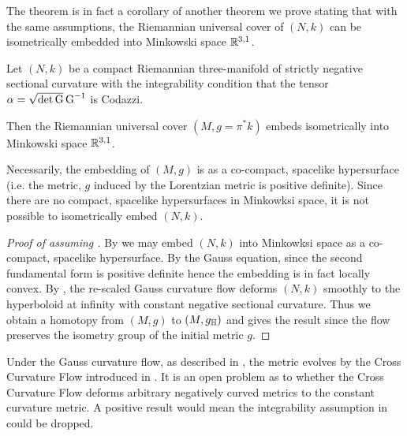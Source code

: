 \documentclass[a4paper, 12pt]{amsart}
\begin{document}
The theorem is in fact a corollary of another theorem we prove stating that with the same assumptions, the Riemannian universal cover of \((N, k)\) can be isometrically embedded into Minkowski space \(\mathbb{R}^{3,1}\).

\begin{thm}
\label{thm:intg_embed}
Let \((N, k)\) be a compact Riemannian three-manifold of strictly negative sectional curvature with the integrability condition that the tensor \(\alpha = \sqrt{\det \operatorname{G}} \operatorname{G}^{-1}\) is Codazzi.

Then the Riemannian universal cover \((M, g = \pi^{\ast} k)\) embeds isometrically into Minkowski space \(\mathbb{R}^{3,1}\).
\end{thm}

\begin{rem}
Necessarily, the embedding of \((M, g)\) is as a co-compact, spacelike hypersurface (i.e. the metric, \(g\) induced by the Lorentzian metric is positive definite). Since there are no compact, spacelike hypersurfaces in Minkowksi space, it is not possible to isometrically embed \((N, k)\).
\end{rem}

\begin{proof}
[Proof of  assuming ]

By  we may embed \((N, k)\) into Minkowksi space as a co-compact, spacelike hypersurface. By the Gauss equation, since the second fundamental form is positive definite hence the embedding is in fact locally convex. By \cite[Theorem 1.1]{MR3344442}, the re-scaled Gauss curvature flow deforms \((N, k)\) smoothly to the hyperboloid at infinity with constant negative sectional curvature. Thus we obtain a homotopy from \((M, g)\) to \((M, g_{\mathbb{H}})\) and  gives the result since the flow preserves the isometry group of the initial metric \(g\).
\end{proof}

\begin{rem}
Under the Gauss curvature flow, as described in \cite[12. Application to the cross-curvature flow]{MR3344442}, the metric evolves by the Cross Curvature Flow introduced in \cite{MR2055396}. It is an open problem as to whether the Cross Curvature Flow deforms arbitrary negatively curved metrics to the constant curvature metric. A positive result would mean the integrability assumption in  could be dropped.
\end{rem}
\end{document}
